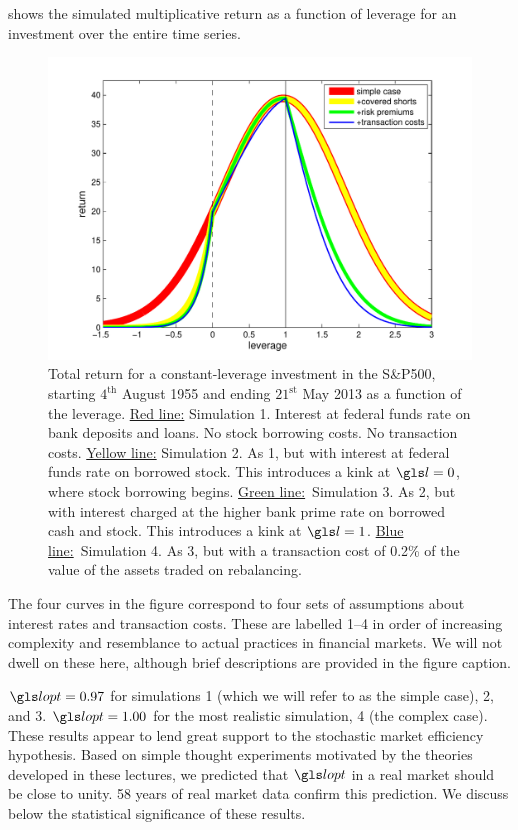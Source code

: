  shows the simulated multiplicative return as a function of leverage for an investment over the entire time series.
\begin{figure}
\centering
\includegraphics[width=\textwidth]{./chapter_4/figs/sme_fig1.pdf}
\caption{Total return for a constant-leverage investment in the S\&P500, starting $4^{\text{th}}$ August 1955 and ending $21^{\text{st}}$ May 2013 as a function of the leverage.
\newline \underline{Red line:} Simulation 1. Interest at federal funds rate on bank deposits and loans. No stock borrowing costs. No transaction costs.
\newline \underline{Yellow line:} Simulation 2. As 1, but with interest at federal funds rate on borrowed stock. This introduces a kink at $\l=0$, where stock borrowing begins.
\newline \underline{Green line:}\ Simulation 3. As 2, but with interest charged at the higher bank prime rate on borrowed cash and stock. This introduces a kink at $\l=1$.
\newline \underline{Blue line:}\ Simulation 4. As 3, but with a transaction cost of 0.2\% of the value of the assets traded on rebalancing.}
\end{figure}
The four curves in the figure correspond to four sets of assumptions about interest rates and transaction costs. These are labelled 1--4 in order of increasing complexity and resemblance to actual practices in financial markets. We will not dwell on these here, although brief descriptions are provided in the figure caption.

$\lopt=0.97$ for simulations 1 (which we will refer to as the simple case), 2, and 3. $\lopt=1.00$ for the most realistic simulation, 4 (the complex case). These results appear to lend great support to the stochastic market efficiency hypothesis. Based on simple thought experiments motivated by the theories developed in these lectures, we predicted that $\lopt$ in a real market should be close to unity. 58 years of real market data confirm this prediction. We discuss below the statistical significance of these results.

